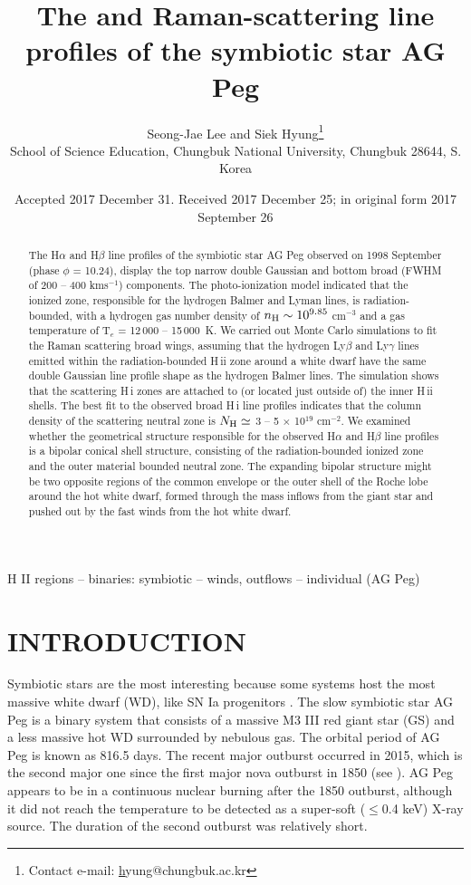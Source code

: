 \documentclass[a4paper,fleqn,usenatbib,useAMS]{mnras}
\title[{\hi} Raman profiles of AG Peg]{The {\ha} and {\hb} Raman-scattering line profiles of the symbiotic star AG Peg}
\author[Lee and Hyung]{Seong-Jae Lee and Siek Hyung\thanks{Contact e-mail: \href{mailto:hyung@chungbuk.ac.kr}hyung@chungbuk.ac.kr} \\
School of Science Education, Chungbuk National University,
Chungbuk 28644, S. Korea}
\date{Accepted 2017 December 31. Received 2017 December 25; in original form 2017 September 26}
\def\ha{H{$\alpha$}}
\def\hb{H{$\beta$}}
\def\hi{H\,{\sc i}}
\def\hii{H\,{\sc ii}}
\def\kms{km\hspace{1pt}s$^{-1}$}
\begin{document}
\label{firstpage}
\pagerange{\pageref{firstpage}--\pageref{lastpage}}
\maketitle



\begin{abstract}
\noindent
The  {\ha} and {\hb} line profiles of the symbiotic star AG Peg observed on 1998 September (phase $\phi$ = 10.24), display the top narrow double Gaussian
and bottom broad (FWHM of 200 -- 400 {\kms}) components.
The photo-ionization model indicated that the ionized zone, responsible for the hydrogen Balmer and Lyman lines, is radiation-bounded, with a hydrogen gas number density of $n_{\rm H} \sim10^{9.85}$ cm$^{-3}$ and a gas temperature  of T$_e$ = 12\,000 -- 15\,000~K.
We carried out Monte Carlo simulations to fit the Raman scattering broad wings, assuming that the
hydrogen Ly$\beta$ and Ly$\gamma$ lines emitted within the radiation-bounded {\hii} zone around a white dwarf have the same double Gaussian line profile shape as the hydrogen Balmer lines.
The simulation shows that the scattering {\hi} zones are attached to (or located just outside of) the inner {\hii} shells.
The best fit to the observed broad {\hi} line profiles indicates that  the column density of the scattering neutral zone is  $N_{\rm H} \simeq $ 3 -- 5 $\times$ 10$^{19}$ cm$^{-2}$.
We examined whether the geometrical structure responsible for the observed {\ha} and {\hb} line profiles is a bipolar conical shell structure, consisting of the radiation-bounded ionized zone and the outer material bounded neutral zone.  The expanding bipolar structure might be two opposite regions of the common envelope or the outer shell of the Roche lobe around the hot white dwarf, formed through the mass inflows from the giant star and pushed out by the fast winds from the hot white dwarf.

\end{abstract}

\begin{keywords}
H II regions -- binaries: symbiotic -- winds, outflows -- individual (AG Peg)
\end{keywords}

\section{INTRODUCTION}

Symbiotic stars are the most interesting because some systems host
the most massive white dwarf (WD), like SN Ia progenitors \citep{mun94, bof94}.
The slow symbiotic star AG Peg is a binary system that consists of a massive M3 III red giant star (GS) and a less massive hot WD surrounded by nebulous gas. The orbital period of AG Peg is known as  816.5 days.
The recent major outburst occurred in 2015, which is the second major one since the first major nova outburst in 1850 (see \citealt{ken01}). AG Peg appears to be  in a  continuous nuclear burning after the 1850 outburst, although it did not reach the temperature to be detected as a super-soft ($\leq $0.4 keV) X-ray source. The duration of the second outburst was relatively short.
\end{document}
